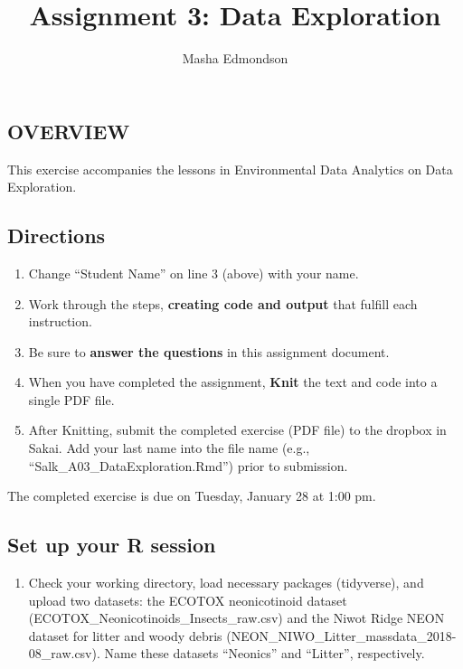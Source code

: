 \documentclass[]{article}
\title{Assignment 3: Data Exploration}
\author{Masha Edmondson}
\date{}
\providecommand{\tightlist}{%
  \setlength{\itemsep}{0pt}\setlength{\parskip}{0pt}}
\begin{document}
\maketitle

\hypertarget{overview}{%
\subsection{OVERVIEW}\label{overview}}

This exercise accompanies the lessons in Environmental Data Analytics on
Data Exploration.

\hypertarget{directions}{%
\subsection{Directions}\label{directions}}

\begin{enumerate}
\def\labelenumi{\arabic{enumi}.}
\tightlist
\item
  Change ``Student Name'' on line 3 (above) with your name.
\item
  Work through the steps, \textbf{creating code and output} that fulfill
  each instruction.
\item
  Be sure to \textbf{answer the questions} in this assignment document.
\item
  When you have completed the assignment, \textbf{Knit} the text and
  code into a single PDF file.
\item
  After Knitting, submit the completed exercise (PDF file) to the
  dropbox in Sakai. Add your last name into the file name (e.g.,
  ``Salk\_A03\_DataExploration.Rmd'') prior to submission.
\end{enumerate}

The completed exercise is due on Tuesday, January 28 at 1:00 pm.

\hypertarget{set-up-your-r-session}{%
\subsection{Set up your R session}\label{set-up-your-r-session}}

\begin{enumerate}
\def\labelenumi{\arabic{enumi}.}
\tightlist
\item
  Check your working directory, load necessary packages (tidyverse), and
  upload two datasets: the ECOTOX neonicotinoid dataset
  (ECOTOX\_Neonicotinoids\_Insects\_raw.csv) and the Niwot Ridge NEON
  dataset for litter and woody debris
  (NEON\_NIWO\_Litter\_massdata\_2018-08\_raw.csv). Name these datasets
  ``Neonics'' and ``Litter'', respectively.
\end{enumerate}
\end{document}
